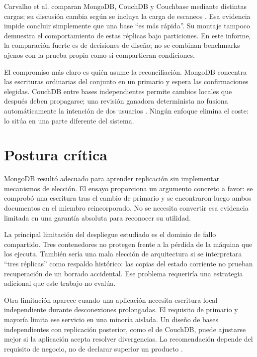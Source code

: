 Carvalho et al. comparan MongoDB, CouchDB y Couchbase mediante distintas cargas; su discusión cambia según se incluya la carga de escaneos \cite[p.~16]{CarvalhoSaBernardino2023}. Esa evidencia impide concluir simplemente que una base ``es más rápida''. Su montaje tampoco demuestra el comportamiento de estas réplicas bajo particiones. En este informe, la comparación fuerte es de decisiones de diseño; no se combinan benchmarks ajenos con la prueba propia como si compartieran condiciones.

El compromiso más claro es quién asume la reconciliación. MongoDB concentra las escrituras ordinarias del conjunto en un primario y espera las confirmaciones elegidas. CouchDB entre bases independientes permite cambios locales que después deben propagarse; una revisión ganadora determinista no fusiona automáticamente la intención de dos usuarios \cite{CouchConflicts}. Ningún enfoque elimina el coste: lo sitúa en una parte diferente del sistema.

\section{Postura crítica}
MongoDB resultó adecuado para aprender replicación sin implementar mecanismos de elección. El ensayo proporciona un argumento concreto a favor: se comprobó una escritura tras el cambio de primario y se encontraron luego ambos documentos en el miembro reincorporado. No se necesita convertir esa evidencia limitada en una garantía absoluta para reconocer su utilidad.

La principal limitación del despliegue estudiado es el dominio de fallo compartido. Tres contenedores no protegen frente a la pérdida de la máquina que los ejecuta. También sería una mala elección de arquitectura si se interpretara ``tres réplicas'' como respaldo histórico: las copias del estado corriente no prueban recuperación de un borrado accidental. Ese problema requeriría una estrategia adicional que este trabajo no evalúa.

Otra limitación aparece cuando una aplicación necesita escritura local independiente durante desconexiones prolongadas. El requisito de primario y mayoría limita ese servicio en una minoría aislada. Un diseño de bases independientes con replicación posterior, como el de CouchDB, puede ajustarse mejor si la aplicación acepta resolver divergencias. La recomendación depende del requisito de negocio, no de declarar superior un producto \cite{MongoElections,CouchReplication,CouchConflicts}.

